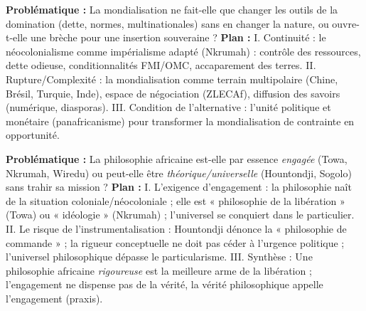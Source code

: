 \documentclass[11pt]{article}
\begin{document}
\begin{corrige}
\textbf{Problématique :} La mondialisation ne fait-elle que changer les outils de la domination (dette, normes, multinationales) sans en changer la nature, ou ouvre-t-elle une brèche pour une insertion souveraine ?
\textbf{Plan :}
I. Continuité : le néocolonialisme comme impérialisme adapté (Nkrumah) : contrôle des ressources, dette odieuse, conditionnalités FMI/OMC, accaparement des terres.
II. Rupture/Complexité : la mondialisation comme terrain multipolaire (Chine, Brésil, Turquie, Inde), espace de négociation (ZLECAf), diffusion des savoirs (numérique, diasporas).
III. Condition de l'alternative : l'unité politique et monétaire (panafricanisme) pour transformer la mondialisation de contrainte en opportunité.
\end{corrige}

\begin{corrige}
\textbf{Problématique :} La philosophie africaine est-elle par essence \emph{engagée} (Towa, Nkrumah, Wiredu) ou peut-elle être \emph{théorique/universelle} (Hountondji, Sogolo) sans trahir sa mission ?
\textbf{Plan :}
I. L'exigence d'engagement : la philosophie naît de la situation coloniale/néocoloniale ; elle est « philosophie de la libération » (Towa) ou « idéologie » (Nkrumah) ; l'universel se conquiert dans le particulier.
II. Le risque de l'instrumentalisation : Hountondji dénonce la « philosophie de commande » ; la rigueur conceptuelle ne doit pas céder à l'urgence politique ; l'universel philosophique dépasse le particularisme.
III. Synthèse : Une philosophie africaine \emph{rigoureuse} est la meilleure arme de la libération ; l'engagement ne dispense pas de la vérité, la vérité philosophique appelle l'engagement (praxis).
\end{corrige}
\end{document}
